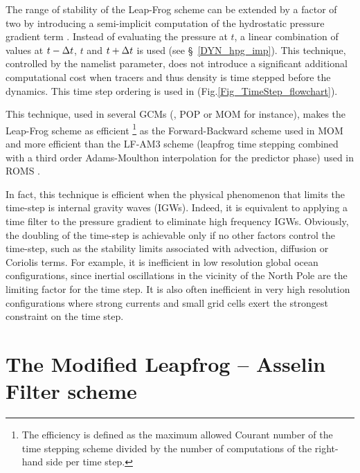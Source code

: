 The range of stability of the Leap-Frog scheme can be extended by a factor of two
by introducing a semi-implicit computation of the hydrostatic pressure gradient term
\citep{Brown_Campana_MWR78}. Instead of evaluating the pressure at $t$, a linear 
combination of values at $t-\Delta t$, $t$ and $t+\Delta t$ is used (see \S~\ref{DYN_hpg_imp}).  
This technique, controlled by the  namelist parameter, does not 
introduce a significant additional computational cost when tracers and thus density 
is time stepped before the dynamics. This time step ordering is used in \NEMO 
(Fig.\ref{Fig_TimeStep_flowchart}).


This technique, used in several GCMs (\NEMO, POP or MOM for instance), 
makes the Leap-Frog scheme as efficient 
\footnote{The efficiency is defined as the maximum allowed Courant number of the time 
stepping scheme divided by the number of computations of the right-hand side per time step.} 
as the Forward-Backward scheme used in MOM \citep{Griffies_al_OS05} and more 
efficient than the LF-AM3 scheme (leapfrog time stepping combined with a third order
Adams-Moulthon interpolation for the predictor phase) used in ROMS 
\citep{Shchepetkin_McWilliams_OM05}. 

In fact, this technique is efficient when the physical phenomenon that 
limits the time-step is internal gravity waves (IGWs). Indeed, it is 
equivalent to applying a time filter to the pressure gradient to eliminate high 
frequency IGWs. Obviously, the doubling of the time-step is achievable only 
if no other factors control the time-step, such as the stability limits associated 
with advection, diffusion or Coriolis terms. For example, it is inefficient in low resolution
global ocean configurations, since inertial oscillations in the vicinity of the North Pole 
are the limiting factor for the time step. It is also often inefficient in very high 
resolution configurations where strong currents and small grid cells exert 
the strongest constraint on the time step.

\section{The Modified Leapfrog -- Asselin Filter scheme}
\label{STP_mLF}

